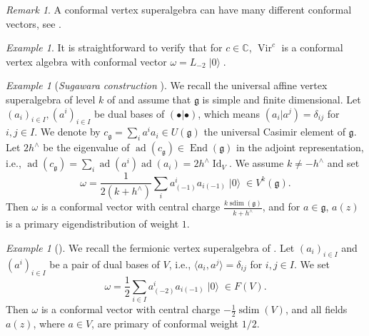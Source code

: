 \documentclass[a4paper, 12pt, reqno]{amsart}
\theoremstyle{remark}
\newtheorem{remark}[theorem]{Remark}
\newtheorem{example}[theorem]{Example}
\numberwithin{equation}{subsection}
\DeclareMathOperator{\Vir}{Vir}
\DeclareMathOperator{\Id}{Id}
\DeclareMathOperator{\End}{End}
\DeclareMathOperator{\vac}{|0\rangle}
\DeclareMathOperator{\ad}{ad}
\DeclareMathOperator{\sdim}{sdim}
\begin{document}
\begin{remark}
  \label{rmk:20}
  A conformal vertex superalgebra can have many different conformal vectors, see \cite[Example 2.5.9]{frenkel_vertex_2001}.
\end{remark}

\begin{example}
  \label{exa:8}
  It is straightforward to verify that for $c \in \mathbb{C}$, $\Vir^c$ is a conformal vertex algebra with conformal vector $\omega = L_{-2}\vac$.
\end{example}

\begin{example}[\emph{Sugawara construction} {\cite[Theorem 5.7]{kac_vertex_1998}}]
  \label{exa:9}
  We recall the universal affine vertex superalgebra of level $k$ of  and assume that $\mathfrak{g}$ is simple and finite dimensional.
  Let $(a_i)_{i \in I}, (a^i)_{i \in I}$ be dual bases of $(\bullet| \bullet)$, which means $(a_i| a^j) = \delta_{ij}$ for $i, j \in I$.
  We denote by $c_{\mathfrak{g}} = \sum_ia^ia_i \in U(\mathfrak{g})$ the universal Casimir element of $\mathfrak{g}$.
  Let $2h^{\wedge}$ be the eigenvalue of $\ad(c_{\mathfrak{g}}) \in \End(\mathfrak{g})$ in the adjoint representation, i.e., $\ad(c_{\mathfrak{g}}) = \sum_i\ad(a^i)\ad(a_i) = 2h^{\wedge}\Id_V$.
  We assume $k \neq -h^{\wedge}$ and set
  \begin{equation*}
    \omega = \frac{1}{2(k + h^{\wedge})}\sum_ia^i_{(-1)}a_{i(-1)}\vac \in V^k(\mathfrak{g}).
  \end{equation*}
  Then $\omega$ is a conformal vector with central charge $\frac{k\sdim(\mathfrak{g})}{k + h^{\wedge}}$, and for $a \in \mathfrak{g}$, $a(z)$ is a primary eigendistribution of weight $1$.
\end{example}

\begin{example}[{\cite[Proposition 4.10]{kac_vertex_1998}}]
  \label{exa:10}
  We recall the fermionic vertex superalgebra of .
  Let $(a_i)_{i \in I}$ and $(a^i)_{i \in I}$ be a pair of dual bases of $V$, i.e., $\langle a_i, a^j\rangle = \delta_{ij}$ for $i, j \in I$.
  We set
  \begin{equation*}
    \omega = \frac{1}{2}\sum_{i \in I}a^i_{(-2)}a_{i(-1)}\vac \in F(V).
  \end{equation*}
  Then $\omega$ is a conformal vector with central charge $-\frac{1}{2}\sdim(V)$, and all fields $a(z)$, where $a \in V$, are primary of conformal weight $1/2$.
\end{example}
\end{document}
